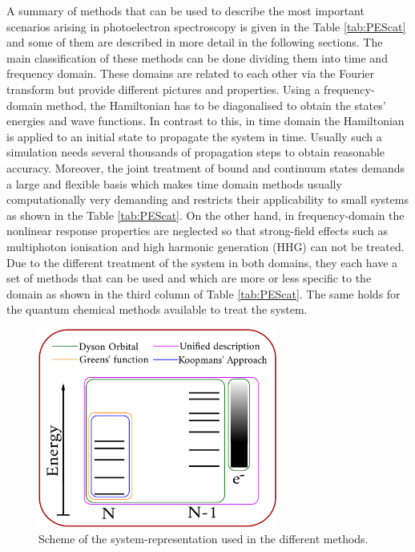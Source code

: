A summary of methods that can be used to describe the most important scenarios arising in photoelectron spectroscopy is given in the Table \ref{tab:PEScat} and some of them are described in more detail in the following sections.
The main classification of these methods can be done dividing them into time and frequency domain.
These domains are related to each other via the Fourier transform but provide different pictures and properties.
Using a frequency-domain method, the Hamiltonian has to be diagonalised to obtain the states' energies and wave functions.
In contrast to this, in time domain the Hamiltonian is applied to an initial state to propagate the system in time.
Usually such a simulation needs several thousands of propagation steps to obtain reasonable accuracy.
Moreover, the joint treatment of bound and continuum states demands a large and flexible basis which makes time domain methods usually computationally very demanding and restricts their applicability to small systems as shown in the Table \ref{tab:PEScat}.
On the other hand, in frequency-domain the nonlinear response properties are neglected so that strong-field effects such as multiphoton ionisation and high harmonic generation (HHG) can not be treated.
Due to the different treatment of the system in both domains, they each have a set of methods that can be used and which are more or less specific to the domain as shown in the third column of Table \ref{tab:PEScat}.
The same holds for the quantum chemical methods available to treat the system.
\begin{figure}
   \includegraphics[width=0.7\textwidth]{Figures/Methods}
   \caption{Scheme of the system-representation used in the different methods.}
   \label{fig:PEScat}
\end{figure}
